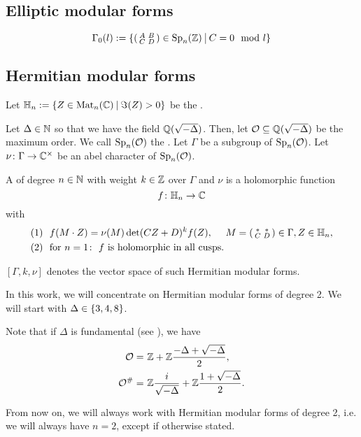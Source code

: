 \subsection{Elliptic modular forms}

\[ \Gamma_0(l) := \Set{\SmallMatrix{A}{B}{C}{D} \in \Sp_n(\Z)}{C = 0 \mod l} \]

\subsection{Hermitian modular forms}

Let $\HalfPlane_n :=  \Set{ Z \in \M_n(\C) }{ \Im(Z) > 0}$ be the .


Let $\Delta \in \mathbb{N}$ so that we have the field $\mathbb{Q}(\sqrt{-\Delta})$.
Then, let $\mathcal{O} \subseteq \mathbb{Q}(\sqrt{-\Delta})$ be the maximum order.
We call $\operatorname{Sp}_n(\mathcal{O})$ the .
Let $\Gamma$ be a subgroup of $\operatorname{Sp}_n(\mathcal{O})$.
Let $\nu \colon \Gamma \rightarrow \mathbb{C}^\times$ be an abel character of $\operatorname{Sp}_n(\mathcal{O})$.

A 
of degree $n\in\mathbb{N}$
with weight $k\in \mathbb{Z}$
over $\Gamma$ and $\nu$
is a holomorphic function
\[ f \colon \mathbb{H}_n \rightarrow \mathbb{C} \]
with
\begin{align*}
(1) \ \ & f(M \cdot Z) = \nu(M) \det(CZ + D)^k f(Z), \ \ \ \ M = \left( \begin{smallmatrix} * & * \\ C & D \end{smallmatrix} \right) \in \Gamma, Z \in \mathbb{H}_n , \\
(2) \ \ & \text{for } n = 1 \colon \ \text{$f$ is holomorphic in all cusps} .
\end{align*}

$[\Gamma, k, \nu]$ denotes the vector space of such Hermitian modular forms.

In this work, we will concentrate on Hermitian modular forms of degree 2. We will start with $\Delta \in \Set{3,4,8}$.

Note that if $\Delta$ is fundamental (see \cite{Dern01Herm}), we have
\begin{align*}
\mathcal{O} = &\ \mathbb{Z} +  \mathbb{Z} \frac{-\Delta+\sqrt{-\Delta}}{2} , \\
\mathcal{O}^\# = & \ \mathbb{Z} \frac{i}{\sqrt{-\Delta}} + \mathbb{Z} \frac{1 + \sqrt{-\Delta}}{2} .
\end{align*}

From now on, we will always work with Hermitian modular forms of degree 2, i.e. we will always have $n=2$, except if otherwise stated.

